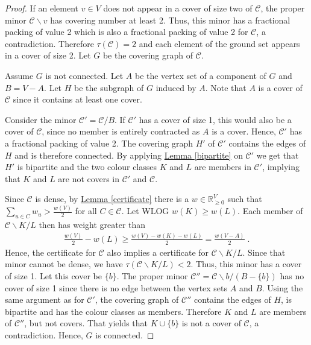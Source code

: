 \documentclass[a4paper, 12pt]{scrbook}
\theoremstyle{definition}
\newcommand*{\IR}{\ensuremath{\mathbb{R}}}
\begin{document}
   \begin{proof}
       If an element $v \in V$ does not appear in a cover of size two of $\mathcal{C}$, the proper minor $\mathcal{C} \backslash v$ has covering number at least 2.
       Thus, this minor has a fractional packing of value 2 which is also a fractional packing of value 2 for $\mathcal{C}$, a contradiction.
       Therefore $\tau(\mathcal{C}) = 2$ and each element of the ground set appears in a cover of size 2.
       Let $G$ be the covering graph of $\mathcal{C}$.

       Assume $G$ is not connected.
       Let $A$ be the vertex set of a component of $G$ and $B = V - A$.
       Let $H$ be the subgraph of $G$ induced by $A$.
       Note that $A$ is a cover of $\mathcal{C}$ since it contains at least one cover.

       Consider the minor $\mathcal{C'}=\mathcal{C}/B$.
       If $\mathcal{C'}$ has a cover of size 1, this would also be a cover of $\mathcal{C}$, since no member is entirely contracted as $A$ is a cover.
       Hence, $\mathcal{C'}$ has a fractional packing of value 2.
       The covering graph $H'$ of $\mathcal{C'}$ contains the edges of $H$ and is therefore connected.
       By applying \hyperref[bipartite]{Lemma \ref*{bipartite}} on $\mathcal{C'}$ we get that $H'$ is bipartite and the two colour classes $K$ and $L$ are members in $\mathcal{C'}$, implying that $K$ and $L$ are not covers in $\mathcal{C'}$ and $\mathcal{C}$.

       Since $\mathcal{C}$ is dense, by \hyperref[certificate]{Lemma \ref*{certificate}} there is a $w \in \IR^V_{\geq 0}$ such that $\sum_{u\in C} w_u > \frac{w(V)}{2}$ for all $C \in \mathcal{C}$.
       Let WLOG $w(K) \geq w(L)$.
       Each member of $\mathcal{C} \backslash K / L$ then has weight greater than
       \begin{align*}
           \frac{w(V)}{2} - w(L) \geq \frac{w(V)-w(K)-w(L)}{2} = \frac{w(V-A)}{2} \;.
       \end{align*}
       Hence, the certificate for $\mathcal{C}$ also implies a certificate for $\mathcal{C}\backslash K /L$.
       Since that minor cannot be dense, we have $\tau(\mathcal{C}\backslash K /L)<2$.
       Thus, this minor has a cover of size 1.
       Let this cover be $\{b\}$.
       The proper minor $\mathcal{C''}=\mathcal{C} \backslash b / (B-\{b\})$ has no cover of size 1 since there is no edge between the vertex sets $A$ and $B$.
       Using the same argument as for $\mathcal{C'}$, the covering graph of $\mathcal{C''}$ contains the edges of $H$, is bipartite and has the colour classes as members.
       Therefore $K$ and $L$ are members of $\mathcal{C''}$, but not covers.
       That yields that $K \cup \{b\}$ is not a cover of $\mathcal{C}$, a contradiction.
       Hence, $G$ is connected.
   \end{proof}
\end{document}
